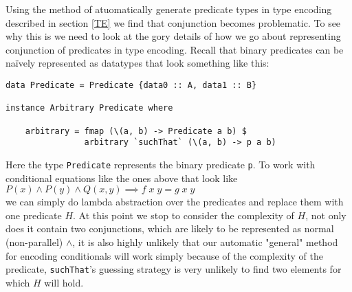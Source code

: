 Using the method of atuomatically generate predicate types in type encoding described in section
\ref{TE} we find that conjunction becomes problematic. To see why this is we need to look at the
gory details of how we go about representing conjunction of predicates in type encoding. Recall that
binary predicates can be naïvely represented as datatypes that look something like this:
\begin{verbatim}data Predicate = Predicate {data0 :: A, data1 :: B}

instance Arbitrary Predicate where
    
    arbitrary = fmap (\(a, b) -> Predicate a b) $
                arbitrary `suchThat` (\(a, b) -> p a b)

\end{verbatim}
Here the type \texttt{Predicate} represents the binary predicate \texttt{p}.
To work with conditional equations like the ones above that look like
\\$P(x) \wedge P(y) \wedge Q(x, y)\implies f\;x\;y=g\;x\;y$\\
we can simply do lambda abstraction over the predicates and replace them with
one predicate $H$. At this point we stop to consider the complexity of $H$, not only
does it contain two conjunctions, which are likely to be represented as normal (non-parallel) $\wedge$,
it is also highly unlikely that our automatic "general" method for encoding conditionals
will work simply because of the complexity of the predicate, \texttt{suchThat}'s guessing strategy
is very unlikely to find two elements for which $H$ will hold.

